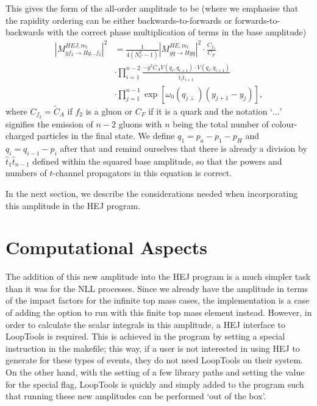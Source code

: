 This gives the form of the all-order amplitude to be (where we emphasise that the rapidity ordering can be either backwards-to-forwards or forwards-to-backwards with the correct phase multiplication of terms in the base amplitude)
\begin{equation}
\begin{split}
|M_{gf_2 \to Hg...f_2}^{HEJ,m_t}|^2 &= \frac{1}{4(N_C^2-1)}|M_{gq \to Hgq}^{HE, m_t}|^2 \cdot \frac{C_{f_2}}{C_F} \\
&\cdot \prod_{i=1}^{n-2} \frac{-g^2 C_A V(q_{i}, q_{i+1}) \cdot V(q_{i}, q_{i+1})}{\hat{t}_{i} \hat{t}_{i+1}}  \\
& \cdot\prod_{j =1}^{n-1} \exp \left[ \omega_0(q_{j \perp})(y_{j+1} - y_j) \right],
\end{split}
\end{equation}
where $C_{f_2} = \tilde{C}_A$ if $f_2$ is a gluon or $C_F$ if it is a quark and the notation `$...$' signifies the emission of $n-2$ gluons with $n$ being the total number of colour-charged particles in the final state. We define $q_1 = p_a - p_1 -p_H$ and $q_i = q_{i-1} - p_i$ after that and remind ourselves that there is already a division by $\hat{t}_1 \hat{t}_{n-1}$ defined within the squared base amplitude, so that the powers and numbers of $t$-channel propagators in this equation is correct. 

In the next section, we describe the considerations needed when incorporating this amplitude in the HEJ program. 

\section{Computational Aspects}

The addition of this new amplitude into the HEJ program is a much simpler task than it was for the NLL processes. Since we already have the amplitude in terms of the impact factors for the infinite top mass cases, the implementation is a case of adding the option to run with this finite top mass element instead. However, in order to calculate the scalar integrals in this amplitude, a HEJ interface to LoopTools is required. This is achieved in the program by setting a special instruction in the makefile; this way, if a user is not interested in using HEJ to generate for these types of events, they do not need LoopTools on their system. On the other hand, with the setting of a few library paths and setting the value for the special flag, LoopTools is quickly and simply added to the program such that running these new amplitudes can be performed `out of the box'. 


